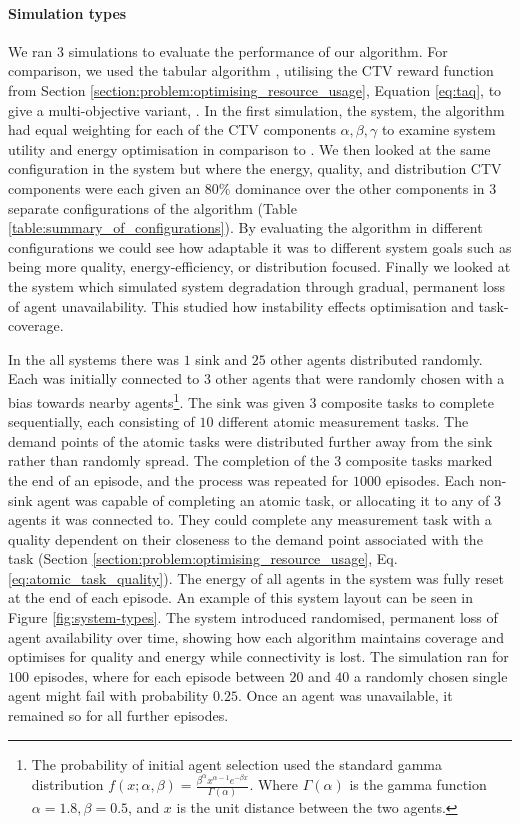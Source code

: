 \paragraph{Simulation types}
We ran $3$ simulations to evaluate the performance of our algorithm. For comparison, we used the tabular \acronymDynaQ{}{} algorithm \citep{Sutton2018}, utilising the CTV reward function from Section \ref{section:problem:optimising_resource_usage}, Equation \ref{eq:taq}, to give a multi-objective variant, \algorithmBaseline{}{}. In the first simulation, the \simulationSimple{}{} system,  the \acronymWSNOptimisation{}{} algorithm had
equal weighting for each of the CTV components $\alpha, \beta, \gamma$ to examine system utility and energy optimisation in comparison to \acronymDynaQ{}{}.  We then looked at the same configuration in the \simulationExtended{}{} system but where the energy, quality, and distribution CTV components were each given an $80\%$ dominance over the other components in $3$ separate configurations of the algorithm (Table \ref{table:summary_of_configurations}). By evaluating the algorithm in different configurations we could see how adaptable it was to different system goals such as being more quality, energy-efficiency, or distribution focused. Finally we looked at the \simulationNodeFailure{}{} system which simulated system degradation through gradual, permanent loss of agent unavailability. This studied how instability effects optimisation and task-coverage.  

In the all systems there was  $1$ sink and $25$ other agents distributed randomly. Each was initially connected to $3$ other agents that were randomly chosen with a bias towards nearby agents\footnote{The probability of initial agent selection used the standard gamma distribution $f(x; \alpha, \beta) = \frac{\beta^{\alpha} x^{\alpha-1}e^{- \beta x}}   {\Gamma(\alpha)}$. Where  $\Gamma(\alpha)$ is the  gamma function $\alpha=1.8, \beta=0.5$, and $x$ is the unit distance between the two agents.}. 
The sink was given $3$ composite tasks to complete sequentially, each consisting of $10$ different atomic measurement tasks. The demand points of the atomic tasks were distributed further away from the sink rather than randomly spread. The completion of the $3$ composite tasks marked the end of an episode, and the process was repeated for $1000$ episodes. Each non-sink agent was capable of completing an atomic task, or allocating it to any of $3$ agents it was connected to. They could complete any measurement task with a quality dependent on their closeness to the demand point associated with the task (Section \ref{section:problem:optimising_resource_usage}, Eq. \ref{eq:atomic_task_quality}). The energy of all agents in the system was fully reset at the end of each episode. An example of this system layout can be seen in Figure \ref{fig:system-types}.  The \simulationNodeFailure{}{} system introduced randomised, permanent loss of agent availability over time, showing how each algorithm maintains coverage and optimises for quality and energy while connectivity is lost. The simulation ran for $100$ episodes, where for each episode between $20$ and $40$  a randomly chosen single agent might fail with probability $0.25$. Once an agent was unavailable, it remained so for all further episodes. 

 

